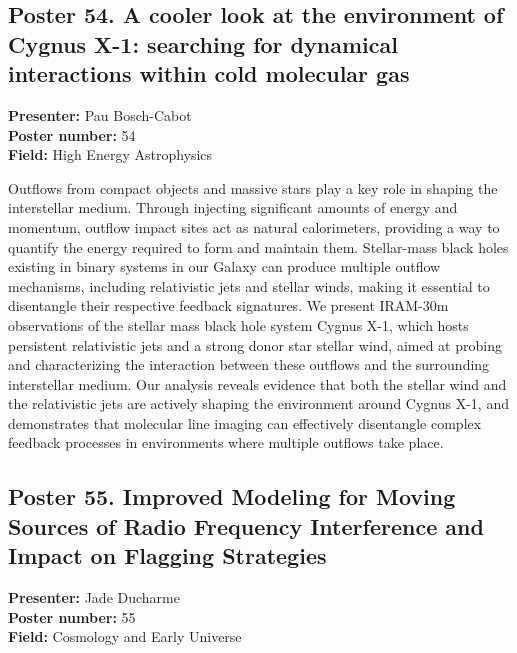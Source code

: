 \hypertarget{poster-abstract-talk-36}{}\label{poster-abstract-page-talk-36}
\subsection*{Poster 54. A cooler look at the environment of Cygnus X-1: searching for dynamical interactions within cold molecular gas}
\textbf{Presenter:} Pau Bosch-Cabot\\
\textbf{Poster number:} 54\\
\textbf{Field:} High Energy Astrophysics

Outflows from compact objects and massive stars play a key role in shaping the interstellar medium. Through injecting significant amounts of energy and momentum, outflow impact sites act as natural calorimeters, providing a way to quantify the energy required to form and maintain them. Stellar-mass black holes existing in binary systems in our Galaxy can produce multiple outflow mechanisms, including relativistic jets and stellar winds, making it essential to disentangle their respective feedback signatures. We present IRAM-30m observations of the stellar mass black hole system Cygnus X-1, which hosts persistent relativistic jets and a strong donor star stellar wind, aimed at probing and characterizing the interaction between these outflows and the surrounding interstellar medium. Our analysis reveals evidence that both the stellar wind and the relativistic jets are actively shaping the environment around Cygnus X-1, and demonstrates that molecular line imaging can effectively disentangle complex feedback processes in environments where multiple outflows take place.

\hypertarget{poster-abstract-talk-87}{}\label{poster-abstract-page-talk-87}
\subsection*{Poster 55. Improved Modeling for Moving Sources of Radio Frequency Interference and Impact on Flagging Strategies}
\textbf{Presenter:} Jade Ducharme\\
\textbf{Poster number:} 55\\
\textbf{Field:} Cosmology and Early Universe

